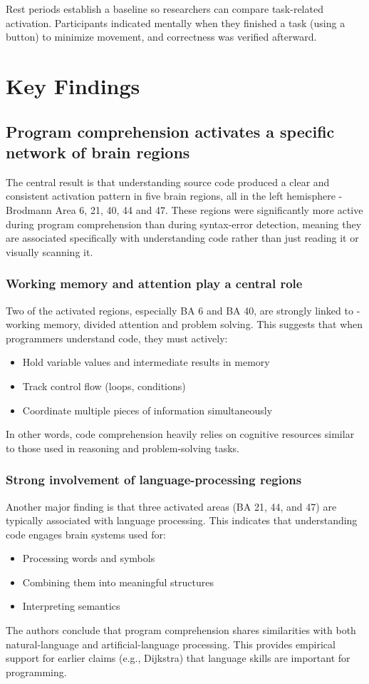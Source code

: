 Rest periods establish a baseline so researchers can compare task-related activation. Participants indicated mentally when they finished a task (using a button) to minimize movement, and correctness was verified afterward.

\section{Key Findings}
\subsection{Program comprehension activates a specific network of brain regions}

The central result is that understanding source code produced a clear and consistent activation pattern in five brain regions, all in the left hemisphere - Brodmann Area 6, 21, 40, 44 and 47. These regions were significantly more active during program comprehension than during syntax-error detection, meaning they are associated specifically with understanding code rather than just reading it or visually scanning it.

\subsubsection{Working memory and attention play a central role}

Two of the activated regions, especially BA 6 and BA 40, are strongly linked to - working memory, divided attention and problem solving. This suggests that when programmers understand code, they must actively:
\begin{itemize}
    \item Hold variable values and intermediate results in memory
    \item Track control flow (loops, conditions)
    \item Coordinate multiple pieces of information simultaneously
\end{itemize}
In other words, code comprehension heavily relies on cognitive resources similar to those used in reasoning and problem-solving tasks.

\subsubsection{Strong involvement of language-processing regions}

Another major finding is that three activated areas (BA 21, 44, and 47) are typically associated with language processing. This indicates that understanding code engages brain systems used for:
\begin{itemize}
    \item Processing words and symbols
    \item Combining them into meaningful structures
    \item Interpreting semantics
\end{itemize}
The authors conclude that program comprehension shares similarities with both natural-language and artificial-language processing. This provides empirical support for earlier claims (e.g., Dijkstra) that language skills are important for programming.

